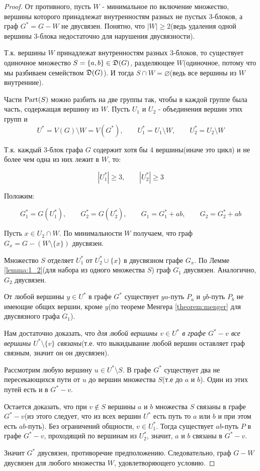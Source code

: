 \begin{proof}
	От противного, пусть $W$ - минимальное по включение множество, вершины которого принадлежат внутренностям разных не пустых 3-блоков, а граф  $G^* = G - W$ не двусвязен.
	Понятно, что  $|W| \geqslant 2$(ведь удаления одной вершины 3-блока недостаточно для нарушения двусвязности).

	Т.к. вершины  $W$ принадлежат внутренностям разных  $3$-блоков, то существует одиночное множество  $S = \{a, b\} \in \mathfrak{D}(G)$, разделяющее  $W$(одиночное, потому что мы разбиваем семейством $\mathfrak{D}(G)$).
	И тогда $S \cap W = \varnothing$(ведь все вершины из $W$ внутренние).
 
	Части $\operatorname{Part}(S)$ можно разбить на две группы так, чтобы в каждой группе была часть, содержащая вершину из  $W$.
	Пусть  $U_1$ и  $U_2$ - объединения вершин этих групп и 
	\[
		U^* = V(G) \setminus W = V(G^*), \qquad U_1^* = U_1 \setminus W, \qquad U^*_2 = U_2 \setminus W
	\]

	Т.к. каждый 3-блок графа $G$ содержит хотя бы 4 вершины(иначе это цикл) и не более чем одна из них лежит в  $W$, то:

	\[
		|U_1^*| \geqslant 3, \qquad |U_2^*| \geqslant 3
	\] 

	Положим:

	\[
		G_1^* = G(U_1^*), \qquad G_2^* = G(U_2^*), \qquad G_1 = G_1^* + ab, \qquad G_2 = G_2^* + ab
	\] 

	Пусть $x \in U_2 \cap W$.
	По минимальности $W$ получаем, что граф  $G_x = G - (W \setminus \{x\})$ двусвязен.

	Множество $S$ отделяет  $U_1^*$ от  $U_2^* \cup \{x \}$ в двусвязном графе $G_x$.
	По Лемме \ref{lemma:1_2}(для набора из одного множества $S$) граф $G_1$ двусвязен.
	Аналогично,  $G_2$ двусвязен.

	От любой вершины  $y \in U^*$ в графе  $G^*$ существует  $ya$-путь  $P_a$ и  $yb$-путь  $P_b$ не имеющие общих вершин, кроме  $y$(по теореме Менгера \ref{theorem:menger} для двусвязного графа  $G_1$). 

	Нам достаточно доказать, что \textit{для любой вершины $v \in U^*$ в графе  $G^* - v$ все вершины  $U^* \setminus \{v\}$ связаны}(т.е. что выкидывание любой вершин оставляет граф связным, значит он он двусвязен).

	Рассмотрим любую вершину $u \in U^* \setminus S$.
	В графе  $G^*$ существует два не пересекающихся пути от  $u$ до вершин множества  $S$(т.е до $a$ и  $b$).
	Один из этих путей есть и в  $G^* - v$.

	Остается доказать, что при  $v \not \in S$ вершины  $a$ и  $b$ множества  $S$ связаны в графе  $G^* - v$(из этого следует, что из всех вершин $U^*$ есть путь то $a$ или $b$ и при этом есть  $ab$-путь).
	Без ограничений общности, $v \in U_1^*$.
	Тогда существует $ab$-путь $P$ в графе $G^* - v$, проходящий по вершинам из $U_2^*$, значит, $a$ и $b$ связаны в  $G^* - v$.

	Значит $G^*$ двусвязен, противоречие предположению.
	Следовательно, граф $G - W$ двусвязен для любого множества $W$, удовлетворяющего условию.
\end{proof}

